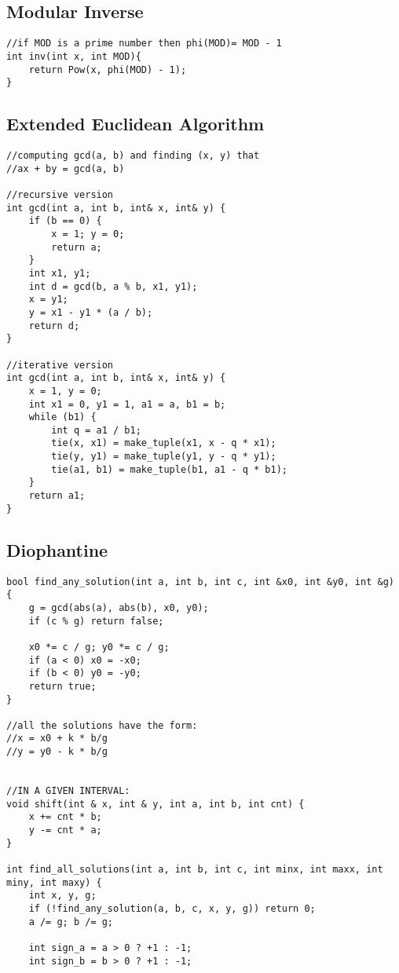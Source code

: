 \documentclass[11pt,a4paper]{article}
\begin{document}
\begin{multicols*}{2}
\subsection{Modular Inverse}
\begin{lstlisting}
//if MOD is a prime number then phi(MOD)= MOD - 1
int inv(int x, int MOD){
    return Pow(x, phi(MOD) - 1);
}
\end{lstlisting}

\subsection{Extended Euclidean Algorithm}
\begin{lstlisting}
//computing gcd(a, b) and finding (x, y) that
//ax + by = gcd(a, b)

//recursive version
int gcd(int a, int b, int& x, int& y) {
    if (b == 0) {
        x = 1; y = 0;
        return a;
    }
    int x1, y1;
    int d = gcd(b, a % b, x1, y1);
    x = y1;
    y = x1 - y1 * (a / b);
    return d;
}

//iterative version
int gcd(int a, int b, int& x, int& y) {
    x = 1, y = 0;
    int x1 = 0, y1 = 1, a1 = a, b1 = b;
    while (b1) {
        int q = a1 / b1;
        tie(x, x1) = make_tuple(x1, x - q * x1);
        tie(y, y1) = make_tuple(y1, y - q * y1);
        tie(a1, b1) = make_tuple(b1, a1 - q * b1);
    }
    return a1;
}
\end{lstlisting}

\subsection{Diophantine}
\begin{lstlisting}
bool find_any_solution(int a, int b, int c, int &x0, int &y0, int &g) {
    g = gcd(abs(a), abs(b), x0, y0);
    if (c % g) return false;

    x0 *= c / g; y0 *= c / g;
    if (a < 0) x0 = -x0;
    if (b < 0) y0 = -y0;
    return true;
}

//all the solutions have the form:
//x = x0 + k * b/g
//y = y0 - k * b/g


//IN A GIVEN INTERVAL:
void shift(int & x, int & y, int a, int b, int cnt) {
    x += cnt * b;
    y -= cnt * a;
}

int find_all_solutions(int a, int b, int c, int minx, int maxx, int miny, int maxy) {
    int x, y, g;
    if (!find_any_solution(a, b, c, x, y, g)) return 0;
    a /= g; b /= g;

    int sign_a = a > 0 ? +1 : -1;
    int sign_b = b > 0 ? +1 : -1;


\end{lstlisting}
\end{multicols*}
\end{document}
